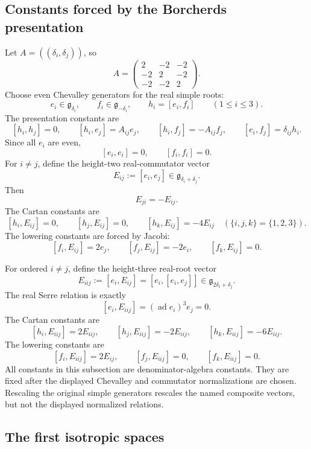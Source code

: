 \subsection{Constants forced by the Borcherds presentation}

Let \(A=((\delta_i,\delta_j))\), so
$$
A=
\begin{pmatrix}
2&-2&-2\\
-2&2&-2\\
-2&-2&2
\end{pmatrix}.
$$
Choose even Chevalley generators for the real simple roots:
$$
e_i\in\mathfrak g_{\delta_i},\qquad
f_i\in\mathfrak g_{-\delta_i},\qquad
h_i=[e_i,f_i]\qquad(1\leq i\leq3).
$$
The presentation constants are
$$
[h_i,h_j]=0,\qquad
[h_i,e_j]=A_{ij}e_j,\qquad
[h_i,f_j]=-A_{ij}f_j,\qquad
[e_i,f_j]=\delta_{ij}h_i.
$$
Since all \(e_i\) are even,
$$
[e_i,e_i]=0,\qquad [f_i,f_i]=0.
$$
For \(i\neq j\), define the height-two real-commutator vector
$$
E_{ij}:=[e_i,e_j]\in\mathfrak g_{\delta_i+\delta_j}.
$$
Then
$$
E_{ji}=-E_{ij}.
$$
The Cartan constants are
$$
[h_i,E_{ij}]=0,\qquad [h_j,E_{ij}]=0,\qquad
[h_k,E_{ij}]=-4E_{ij}\quad(\{i,j,k\}=\{1,2,3\}).
$$
The lowering constants are forced by Jacobi:
$$
[f_i,E_{ij}]=2e_j,\qquad [f_j,E_{ij}]=-2e_i,\qquad
[f_k,E_{ij}]=0.
$$

For ordered \(i\neq j\), define the height-three real-root vector
$$
E_{iij}:=[e_i,E_{ij}]
=[e_i,[e_i,e_j]]
\in \mathfrak g_{2\delta_i+\delta_j}.
$$
The real Serre relation is exactly
$$
[e_i,E_{iij}]=(\operatorname{ad}e_i)^3e_j=0.
$$
The Cartan constants are
$$
[h_i,E_{iij}]=2E_{iij},\qquad
[h_j,E_{iij}]=-2E_{iij},\qquad
[h_k,E_{iij}]=-6E_{iij}.
$$
The lowering constants are
$$
[f_i,E_{iij}]=2E_{ij},\qquad
[f_j,E_{iij}]=0,\qquad
[f_k,E_{iij}]=0.
$$
All constants in this subsection are denominator-algebra constants.
They are fixed after the displayed Chevalley and commutator
normalizations are chosen.  Rescaling the original simple generators
rescales the named composite vectors, but not the displayed normalized
relations.

\subsection{The first isotropic spaces}

